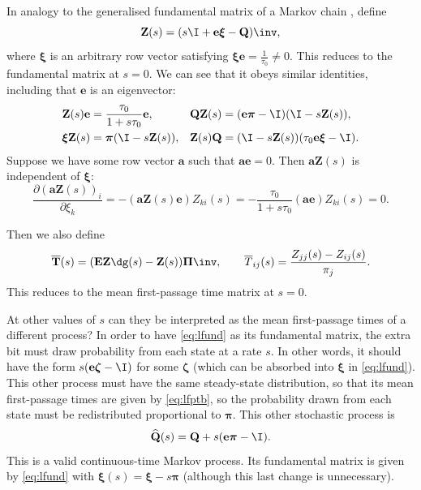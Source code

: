 \documentclass[12pt]{article}
\newcommand{\onev}{\mathbf{e}}
\newcommand{\onem}{\mathbf{E}}
\newcommand{\MMm}{Q}
\newcommand{\MM}{\mathbf{\MMm}}
\newcommand{\eqm}{\pi}
\newcommand{\eq}{\boldsymbol{\eqm}}
\newcommand{\Eqm}{\Pi}
\newcommand{\Eq}{\boldsymbol{\Eqm}}
\newcommand{\fptm}{T}
\newcommand{\fpt}{\mathbf{\fptm}}
\newcommand{\fptbm}{\overline{\fptm}}
\newcommand{\fptb}{\overline{\fpt}}
\newcommand{\fundm}{Z}
\newcommand{\fund}{\mathbf{\fundm}}
\newcommand{\arowm}{\xi}
\newcommand{\arow}{\boldsymbol{\arowm}}
\renewcommand{\pdiff}[2]{\frac{\partial #1}{\partial #2}}
\newcommand{\shift}[1]{\widehat{#1}}
\begin{document}
In analogy to the generalised fundamental matrix of a Markov chain \cite{Kemeny1981fund}, define
%
\begin{equation}\label{eq:lfund}
  \fund(s) = (s \I + \onev \arow -\MM)\inv,
\end{equation}
%
where \(\arow\) is an arbitrary row vector satisfying \(\arow \onev = \frac{1}{\tau_0} \neq 0\).
This reduces to the fundamental matrix at \(s=0\).
We can see that it obeys similar identities, including that \(\onev\) is an eigenvector:
%
\begin{equation}\label{eq:lfundrowsum}
\begin{aligned}
  \fund(s) \onev &= \frac{\tau_0}{1+s\tau_0}\onev, \qquad &
  \MM \fund(s) &= (\onev \eq - \I)(\I - s \fund(s)), \\ 
  \arow \fund(s) &= \eq (\I - s \fund(s)),  &
  \fund(s) \MM &= (\I - s \fund(s))(\tau_0 \onev \arow - \I).
\end{aligned}
\end{equation}
%
Suppose we have some row vector \(\mathbf{a}\) such that \(\mathbf{a}\onev=0\).
Then \(\mathbf{a}\fund(s)\) is independent of \(\arow\):
%
\begin{equation}\label{eq:alfund}
  \pdiff{(\mathbf{a}\fund(s))_i}{\arowm_k} = -(\mathbf{a}\fund(s)\onev) \fundm_{ki}(s)
      = -\frac{\tau_0}{1+s\tau_0} (\mathbf{a}\onev) \fundm_{ki}(s) = 0.
\end{equation}
%

Then we also define
%
\begin{equation}\label{eq:lfptb}
  \fptb(s) = (\onem \fund\dg(s)-\fund(s))\Eq\inv,
  \qquad
  \fptbm_{ij}(s) = \frac{\fundm_{jj}(s)-\fundm_{ij}(s)}{\eqm_j}.
\end{equation}
%
This reduces to the mean first-passage time matrix at \(s=0\). 

At other values of \(s\) can they be interpreted as the mean first-passage times of a different process?
In order to have \cref{eq:lfund} as its fundamental matrix, the extra bit must draw probability from each state at a rate \(s\).
In other words, it should have the form \(s(\onev \boldsymbol{\zeta} - \I)\) for some \(\boldsymbol{\zeta} \) 
(which can be absorbed into \(\arow\) in \cref{eq:lfund}).
This other process must have the same steady-state distribution, so that its mean first-passage times are given by \cref{eq:lfptb}, so the probability drawn from each state must be redistributed proportional to \(\eq\).
This other stochastic process is
%
\begin{equation}\label{eq:lshift}
  \shift{\MM}(s) = \MM + s (\onev \eq - \I).
\end{equation}
%
This is a valid continuous-time Markov process.
Its fundamental matrix is given by \cref{eq:lfund} with \( \arow(s) = \arow - s \eq \) (although this last change is unnecessary).
\end{document}
